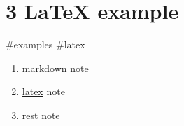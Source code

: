 \chapter{3 LaTeX example}
#examples #latex

\begin{enumerate}
\item \href{#1}{markdown}  note
\item \href{#3}{latex} note
\item \href{#4}{rest} note
\end{enumerate}
